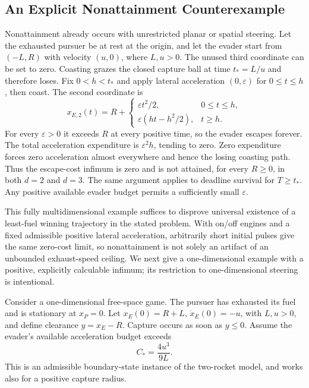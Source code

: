 \documentclass[journal,a4paper]{IEEEtran}
\begin{document}
\subsection{An Explicit Nonattainment Counterexample}
\label{sec:nonattain}
Nonattainment already occurs with unrestricted planar or spatial steering. Let the exhausted pursuer be at rest at the origin, and let the evader start from $(-L,R)$ with velocity $(u,0)$, where $L,u>0$. The unused third coordinate can be set to zero. Coasting grazes the closed capture ball at time $t_*=L/u$ and therefore loses. Fix $0<h<t_*$ and apply lateral acceleration $(0,\varepsilon)$ for $0\le t\le h$, then coast. The second coordinate is
\begin{equation}
 x_{E,2}(t)=R+
 \begin{cases}
 \varepsilon t^2/2,&0\le t\le h,\\
 \varepsilon(ht-h^2/2),&t\ge h.
 \end{cases}
\end{equation}
For every $\varepsilon>0$ it exceeds $R$ at every positive time, so the evader escapes forever. The total acceleration expenditure is $\varepsilon^2h$, tending to zero. Zero expenditure forces zero acceleration almost everywhere and hence the losing coasting path. Thus the escape-cost infimum is zero and is not attained, for every $R\ge0$, in both $d=2$ and $d=3$. The same argument applies to deadline survival for $T\ge t_*$. Any positive available evader budget permits a sufficiently small $\varepsilon$.

This fully multidimensional example suffices to disprove universal existence of a least-fuel winning trajectory in the stated problem. With on/off engines and a fixed admissible positive lateral acceleration, arbitrarily short initial pulses give the same zero-cost limit, so nonattainment is not solely an artifact of an unbounded exhaust-speed ceiling. We next give a one-dimensional example with a positive, explicitly calculable infimum; its restriction to one-dimensional steering is intentional.

Consider a one-dimensional free-space game. The pursuer has exhausted its fuel and is stationary at $x_P=0$. Let $x_E(0)=R+L$, $\dot x_E(0)=-u$, with $L,u>0$, and define clearance $y=x_E-R$. Capture occurs as soon as $y\le0$. Assume the evader's available acceleration budget exceeds
\begin{equation}
 C_* =\frac{4u^3}{9L}.
 \label{eq:Cstar}
\end{equation}
This is an admissible boundary-state instance of the two-rocket model, and works also for a positive capture radius.
\end{document}
